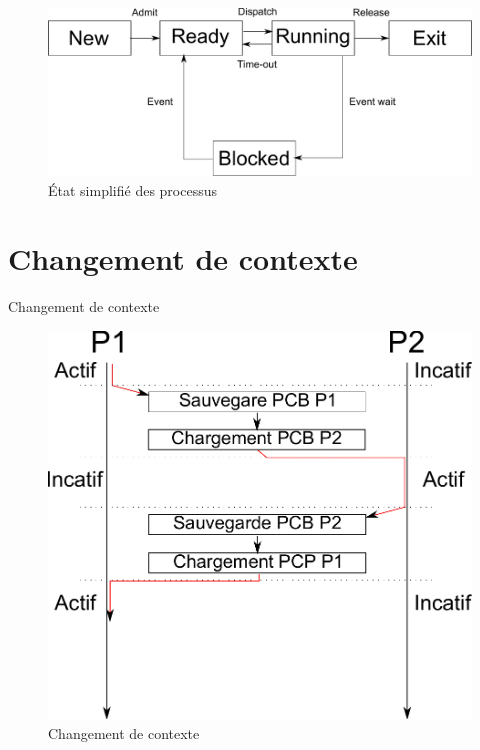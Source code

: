 \begin{frame}{\sectitle}
\begin{figure}
\includegraphics[width=.9\textwidth]{images/StateSimple.pdf}
\caption{État simplifié des processus}
\end{figure}
\end{frame}


\def\sectitle{Changement de contexte}
\section{\sectitle}

\begin{frame}{\sectitle}
\begin{figure}
\includegraphics[width=.9\textwidth]{images/ContextChange.pdf}
\caption{Changement de contexte}
\end{figure}
\end{frame}

